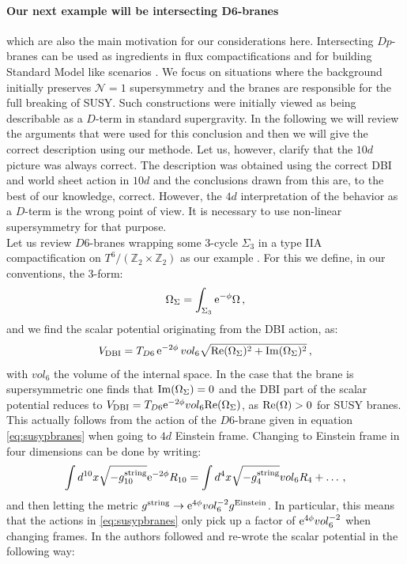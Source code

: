 \documentclass[a4paper,12pt]{report}
\newcommand{\be}{\begin{equation}}
\newcommand{\ee}{\end{equation}}
\def\rme{{\rm e}}
\def\rmre{{\rm Re}}
\def\rmim{{\rm Im}}
\begin{document}
\paragraph{Our next example will be intersecting $\mathbf{D6}$-branes} which are also the main motivation for our considerations here. Intersecting $Dp$-branes can be used as ingredients in flux compactifications and for building Standard Model like scenarios \cite{Blumenhagen:2006ci,Blumenhagen:2005mu}. We focus on situations where the background initially preserves $\mathcal{N}=1$ supersymmetry and the branes are responsible for the full breaking of SUSY. Such constructions were initially viewed as being describable as a $D$-term in standard supergravity. In the following we will review the arguments that were used for this conclusion and then we will give the correct description using our methode. Let us, however, clarify that the $10d$ picture was always correct. The description was obtained using the correct DBI and world sheet action in $10d$ and the conclusions drawn from this are, to the best of our knowledge, correct. However, the $4d$ interpretation of the behavior as a $D$-term is the wrong point of view. It is necessary to use non-linear supersymmetry for that purpose.\\
Let us review $D6$-branes wrapping some 3-cycle $\Sigma_3$ in a type IIA compactification on $T^6/(\mathbb{Z}_2 \times \mathbb{Z}_2)$ as our example \cite{Villadoro:2006ia}. For this we define, in our conventions, the 3-form:
\be 
\Omega_\Sigma = \int_{\Sigma_3} \rme^{-\phi} \Omega\,,
\ee
and we find the scalar potential originating from the DBI action, as:
\be 
V_{\text{DBI}} = T_{D6} \, \rme^{-2\phi} \, vol_6 \sqrt{\rmre (\Omega_\Sigma)^2 + \rmim (\Omega_\Sigma)^2}\,,
\label{eq:D6DBIact}
\ee
with $vol_6$ the volume of the internal space. In the case that the brane is supersymmetric one finds that $\rmim (\Omega_\Sigma) = 0$ and the DBI part of the scalar potential reduces to $V_{\text{DBI}} =T_{D6} \rme^{-2\phi} vol_6 \rmre (\Omega_\Sigma)$, as $\rmre (\Omega) > 0$ for SUSY branes. This actually follows from the action of the $D6$-brane given in equation \eqref{eq:susypbranes} when going to $4d$ Einstein frame. Changing to Einstein frame in four dimensions can be done by writing:
\be 
\int d^{10}x \sqrt{-g^{\text{string}}_{10}} \rme^{-2\phi} R_{10} = \int d^4x \sqrt{-g_4^{\text{string}}} vol_6 R_4 + \ldots\,,
\ee
and then letting the metric $g^{\text{string}} \to \rme^{4 \phi} vol_6^{-2} g^{\text{Einstein}}$. In particular, this means that the actions in \eqref{eq:susypbranes} only pick up a factor of $\rme^{4 \phi} vol_6^{-2}$ when changing frames. In \cite{Villadoro:2006ia} the authors followed \cite{Blumenhagen:2002wn} and re-wrote the scalar potential in the following way:
\end{document}
